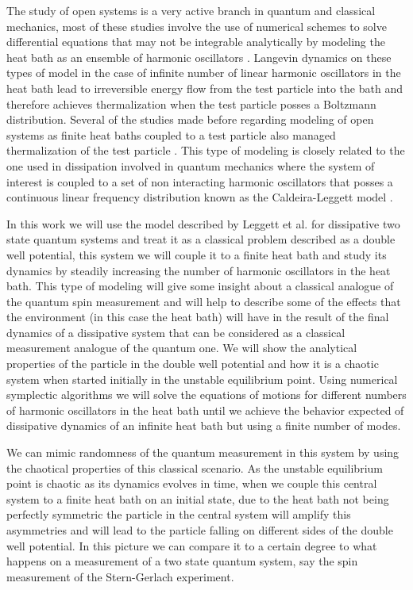 The study of open systems is a very active branch in quantum and classical mechanics, most of these studies involve the use of numerical schemes to solve differential equations that may not be integrable analytically by modeling the heat bath as an ensemble of harmonic oscillators \cite{flambaum1997statistical}\cite{flambaum1997distribution}\cite{mazur1960poincare}.  Langevin dynamics on these types of model in the case of infinite number of linear harmonic oscillators in the heat bath lead to irreversible energy flow from the test particle into the bath and therefore achieves thermalization when the test particle posses a Boltzmann distribution. Several of the studies made before regarding modeling of open systems as finite heat baths coupled to a test particle also managed thermalization of the test particle \cite{flambaum1997statistical}\cite{ford1998radiating}\cite{smith2008thermalization}\cite{hasegawa2011classical}. This type of modeling is closely related to the one used in dissipation involved in quantum mechanics where the system of interest is coupled to a set of non interacting harmonic oscillators that posses a continuous linear frequency distribution known as the Caldeira-Leggett model \cite{caldeira1983quantum}. \par

In this work we will use the model described by Leggett et al. \cite{leggett1987dynamics} for dissipative two state quantum systems and treat it as a classical problem described as a double well potential, this system we will couple it to a finite heat bath and study its dynamics by steadily increasing the number of harmonic oscillators in the heat bath. This type of modeling will give some insight about a classical analogue of the quantum spin measurement and will help to describe some of the effects that the environment (in this case the heat bath) will have in the result of the final dynamics of a dissipative system that can be considered as a classical measurement analogue of the quantum one. We will show the analytical properties of the particle in the double well potential and how it is a chaotic system when started initially in the unstable equilibrium point. Using numerical symplectic algorithms we will solve the equations of motions for different numbers of harmonic oscillators in the heat bath until we achieve the behavior expected of dissipative dynamics of an infinite heat bath but using a finite number of modes.

We can mimic randomness of the quantum measurement in this system by using the chaotical properties of this classical scenario. As the unstable equilibrium point is chaotic as its dynamics evolves in time, when we couple this central system to a finite heat bath on an initial  state, due to the heat bath not being perfectly symmetric the particle in the central system will amplify this asymmetries and will lead to the particle falling on different sides of the double well potential. In this picture we can compare it to a certain degree to what happens on a measurement of a two state quantum system, say the spin measurement of the Stern-Gerlach experiment.

